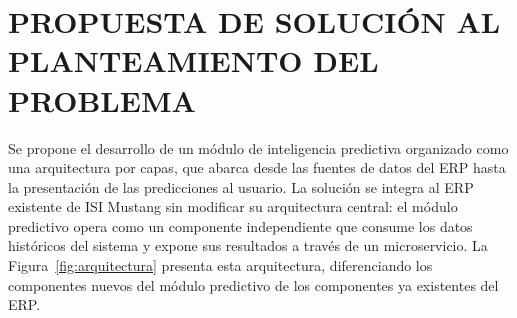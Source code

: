 \documentclass{univalle-perfil}
\begin{document}
\section{PROPUESTA DE SOLUCIÓN AL PLANTEAMIENTO DEL PROBLEMA}

Se propone el desarrollo de un módulo de inteligencia predictiva organizado como una arquitectura por capas, que abarca desde las fuentes de datos del ERP hasta la presentación de las predicciones al usuario. La solución se integra al ERP existente de ISI Mustang sin modificar su arquitectura central: el módulo predictivo opera como un componente independiente que consume los datos históricos del sistema y expone sus resultados a través de un microservicio. La Figura~\ref{fig:arquitectura} presenta esta arquitectura, diferenciando los componentes nuevos del módulo predictivo de los componentes ya existentes del ERP.
\end{document}

